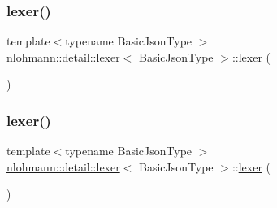 \subsubsection{\texorpdfstring{lexer()}{lexer()}\hspace{0.1cm}{\footnotesize\ttfamily [2/3]}}
{\footnotesize\ttfamily template$<$typename Basic\+Json\+Type $>$ \\
\mbox{\hyperlink{classnlohmann_1_1detail_1_1lexer}{nlohmann\+::detail\+::lexer}}$<$ Basic\+Json\+Type $>$\+::\mbox{\hyperlink{classnlohmann_1_1detail_1_1lexer}{lexer}} (\begin{DoxyParamCaption}\item[{const \mbox{\hyperlink{classnlohmann_1_1detail_1_1lexer}{lexer}}$<$ Basic\+Json\+Type $>$ \&}]{ }\end{DoxyParamCaption})\hspace{0.3cm}{\ttfamily [delete]}}

\mbox{\label{classnlohmann_1_1detail_1_1lexer_a9045348915010649fad1f15e80b6e34d}} 
\subsubsection{\texorpdfstring{lexer()}{lexer()}\hspace{0.1cm}{\footnotesize\ttfamily [3/3]}}
{\footnotesize\ttfamily template$<$typename Basic\+Json\+Type $>$ \\
\mbox{\hyperlink{classnlohmann_1_1detail_1_1lexer}{nlohmann\+::detail\+::lexer}}$<$ Basic\+Json\+Type $>$\+::\mbox{\hyperlink{classnlohmann_1_1detail_1_1lexer}{lexer}} (\begin{DoxyParamCaption}\item[{\mbox{\hyperlink{classnlohmann_1_1detail_1_1lexer}{lexer}}$<$ Basic\+Json\+Type $>$ \&\&}]{ }\end{DoxyParamCaption})\hspace{0.3cm}{\ttfamily [delete]}}

\mbox{\label{classnlohmann_1_1detail_1_1lexer_a2f2ef6f5aca9a0c48fcfb1290f7b2b0d}} 
